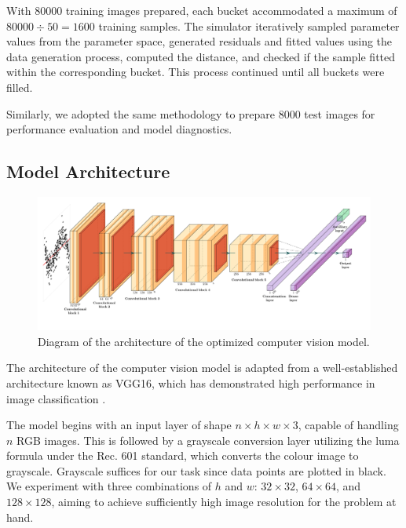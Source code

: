 \documentclass[]{interact}
\theoremstyle{plain}%
\theoremstyle{definition}
\theoremstyle{remark}
\begin{document}
With 80000 training images prepared, each bucket accommodated a maximum
of \(80000 \div 50 = 1600\) training samples. The simulator iteratively
sampled parameter values from the parameter space, generated residuals
and fitted values using the data generation process, computed the
distance, and checked if the sample fitted within the corresponding
bucket. This process continued until all buckets were filled.

Similarly, we adopted the same methodology to prepare 8000 test images
for performance evaluation and model diagnostics.

\subsection{Model Architecture}\label{model-architecture}

\begin{figure}

{\centering \includegraphics[width=1\linewidth]{cnn} 

}

\caption{Diagram of the architecture of the optimized computer vision model.}\label{fig:unnamed-chunk-2}
\end{figure}

The architecture of the computer vision model is adapted from a
well-established architecture known as VGG16, which has demonstrated
high performance in image classification \citep{simonyan2014very}.

The model begins with an input layer of shape
\(n \times h \times w \times 3\), capable of handling \(n\) RGB images.
This is followed by a grayscale conversion layer utilizing the luma
formula under the Rec. 601 standard, which converts the colour image to
grayscale. Grayscale suffices for our task since data points are plotted
in black. We experiment with three combinations of \(h\) and \(w\):
\(32 \times 32\), \(64 \times 64\), and \(128 \times 128\), aiming to
achieve sufficiently high image resolution for the problem at hand.
\end{document}
